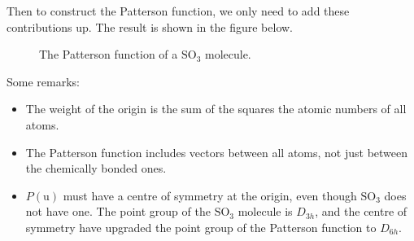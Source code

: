\documentclass{article}
\theoremstyle{plain}\theoremheaderfont{\normalfont\itshape}\theorembodyfont{\rmfamily}\theoremseparator{.}\newtheorem*{rem}{Remark}\newtheorem*{ex}{Example}\newtheorem*{proof}{Proof}\newtheorem*{altp}{Alternative proof}
\theoremstyle{plain}\theoremheaderfont{\normalfont\bfseries}\theorembodyfont{\rmfamily}\theoremseparator{.}\newtheorem{thm}{Theorem}[section]\newtheorem{lem}[thm]{Lemma}\newtheorem{prop}[thm]{Proposition}\newtheorem*{cor}{Corollary}\newtheorem{defn}[thm]{Definition}\newtheorem{clm}[thm]{Claim}\newtheorem{clminproof}{Claim}\newtheorem*{law}{Law}\newtheorem{pos}[thm]{Postulate}
\theoremstyle{break}\theoremheaderfont{\normalfont\itshape}\theorembodyfont{\rmfamily}\theoremseparator{.\medskip}\newtheorem*{proofskip}{Proof}\newtheorem*{exs}{Examples}\newtheorem*{rems}{Remarks}
\theoremstyle{break}\theoremheaderfont{\normalfont\bfseries}\theorembodyfont{\rmfamily}\theoremseparator{.\medskip}\newtheorem{lemskip}[thm]{Lemma}\newtheorem{defnskip}[thm]{Definition}\newtheorem{propskip}[thm]{Proposition}\newtheorem{thmskip}[thm]{Theorem}
\numberwithin{equation}{section}
\newcommand{\vb}[1]{\bm{\mathrm{#1}}}
\begin{document}
    Then to construct the Patterson function, we only need to add these contributions up. The result is shown in the figure below.
    \begin{figure}[ht!]
        \centering
        \caption{The Patterson function of a \(\mathrm{SO_3}\) molecule.}
    \end{figure}

    Some remarks:
    \begin{itemize}
        \item The weight of the origin is the sum of the squares the atomic numbers of all atoms.
        \item The Patterson function includes vectors between all atoms, not just between the chemically bonded ones.
        \item \(P(\vb{u})\) must have a centre of symmetry at the origin, even though \(\mathrm{SO_3}\) does not have one. The point group of the \(\mathrm{SO_3}\) molecule is \(D_{3h}\), and the centre of symmetry have upgraded the point group of the Patterson function to \(D_{6h}\).
    \end{itemize}
\end{document}
